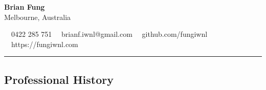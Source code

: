 \documentclass[11pt,letterpaper]{article}
\begin{document}
\begin{center}
	{\LARGE \textbf{Brian Fung}}\\
	Melbourne, Australia
	\vspace{0.1cm}
	\\
\end{center}

\begin{center}
	\vspace{0.01cm}
	\raisebox{-0.2\height} {\Large \faPhoneSquare} \ \  0422 285 751 \hfill\raisebox{-0.2\height}{\Large \faEnvelopeSquare} \ \ brianf.iwnl@gmail.com \hfill \raisebox{-0.2\height}{\Large \faGithubSquare} \ \ github.com/fungiwnl \hfill \raisebox{-0.2\height}{\Large \faGlobe} \ \ https://fungiwnl.com
\end{center}

\hrule
\vspace{-1em}
\subsection*{\Large Professional History}
\end{document}
